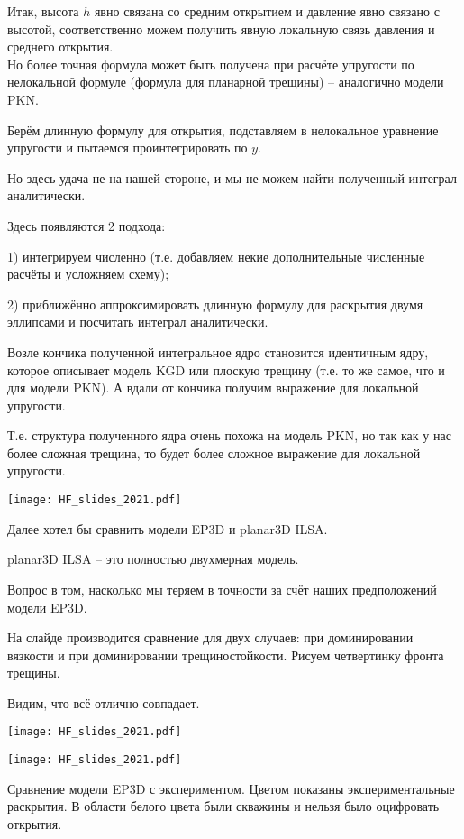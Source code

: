 \documentclass[main.tex]{subfiles}
\begin{document}
Итак, высота $h$ явно связана со средним открытием и давление явно связано с высотой, соответственно можем получить явную локальную связь давления и среднего открытия.
\\

Но более точная формула может быть получена при расчёте упругости по нелокальной формуле (формула для планарной трещины) -- аналогично модели PKN.

Берём длинную формулу для открытия, подставляем в нелокальное уравнение упругости и пытаемся проинтегрировать по $y$.

Но здесь удача не на нашей стороне, и мы не можем найти полученный интеграл аналитически.

Здесь появляются 2 подхода:

1) интегрируем численно (т.е. добавляем некие дополнительные численные расчёты и усложняем схему);

2) приближённо аппроксимировать длинную формулу для раскрытия двумя эллипсами и посчитать интеграл аналитически.

Возле кончика полученной интегральное ядро становится идентичным ядру, которое описывает модель KGD или плоскую трещину (т.е. то же самое, что и для модели PKN).
А вдали от кончика получим выражение для локальной упругости.

Т.е. структура полученного ядра очень похожа на модель PKN, но так как у нас более сложная трещина, то будет более сложное выражение для локальной упругости. 

\texttt{[image: HF\_slides\_2021.pdf]}

Далее хотел бы сравнить модели EP3D и planar3D ILSA.

planar3D ILSA -- это полностью двухмерная модель.

Вопрос в том, насколько мы теряем в точности за счёт наших предположений модели EP3D.

На слайде производится сравнение для двух случаев: при доминировании вязкости и при доминировании трещиностойкости.
Рисуем четвертинку фронта трещины.

Видим, что всё отлично совпадает.

\texttt{[image: HF\_slides\_2021.pdf]}

\texttt{[image: HF\_slides\_2021.pdf]}

Сравнение модели EP3D с экспериментом.
Цветом показаны экспериментальные раскрытия.
В области белого цвета были скважины и нельзя было оцифровать открытия.
\\
\end{document}
